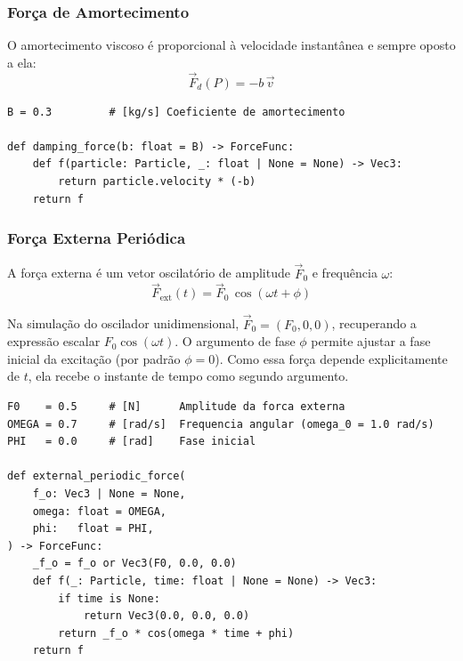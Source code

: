 \subsubsection{Força de Amortecimento}

O amortecimento viscoso é proporcional à velocidade instantânea e sempre oposto a ela:
\begin{equation}
    \vec{F}_d(P) = -b\,\vec{v}
\end{equation}

\begin{lstlisting}[caption={Força de amortecimento como closure}, label={lst:2.damping}]
B = 0.3         # [kg/s] Coeficiente de amortecimento

def damping_force(b: float = B) -> ForceFunc:
    def f(particle: Particle, _: float | None = None) -> Vec3:
        return particle.velocity * (-b)
    return f
\end{lstlisting}

\subsubsection{Força Externa Periódica}

A força externa é um vetor oscilatório de amplitude $\vec{F}_0$ e frequência $\omega$:
\begin{equation}
    \vec{F}_\text{ext}(t) = \vec{F}_0\,\cos(\omega t + \phi)
\end{equation}

Na simulação do oscilador unidimensional, $\vec{F}_0 = (F_0, 0, 0)$, recuperando a expressão escalar $F_0\cos(\omega t)$. O argumento de fase $\phi$ permite ajustar a fase inicial da excitação (por padrão $\phi = 0$). Como essa força depende explicitamente de $t$, ela recebe o instante de tempo como segundo argumento.

\begin{lstlisting}[caption={Força externa periodica como closure}, label={lst:2.external}]
F0    = 0.5     # [N]      Amplitude da forca externa
OMEGA = 0.7     # [rad/s]  Frequencia angular (omega_0 = 1.0 rad/s)
PHI   = 0.0     # [rad]    Fase inicial

def external_periodic_force(
    f_o: Vec3 | None = None,
    omega: float = OMEGA,
    phi:   float = PHI,
) -> ForceFunc:
    _f_o = f_o or Vec3(F0, 0.0, 0.0)
    def f(_: Particle, time: float | None = None) -> Vec3:
        if time is None:
            return Vec3(0.0, 0.0, 0.0)
        return _f_o * cos(omega * time + phi)
    return f
\end{lstlisting}

